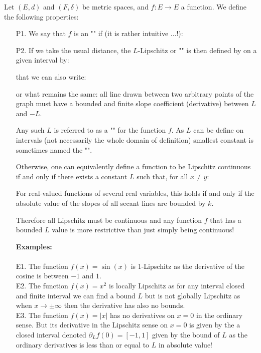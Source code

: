 	Let $(E, d)$ and $(F,\delta)$ be metric spaces, and $f:E \rightarrow E$ a function. We define the following properties:
	\begin{enumerate}
		\item[P1.] We say that $f$ is an "" if (it is rather intuitive ...!):
		
		
		\item[P2.] If we take the usual distance, the $L$-Lipschitz or "" is then defined by on a given interval by:
		
		that we can also write:
		
		or what remains the same: all line drawn between two arbitrary points of the graph must have a bounded and finite slope coefficient (derivative) between $L$ and $-L$.
		
		Any such $L$ is referred to as a "" for the function $f$. As $L$ can be define on intervals (not necessarily the whole domain of definition) smallest constant is sometimes named the "".
		
		Otherwise, one can equivalently define a function to be Lipschitz continuous if and only if there exists a constant $L$ such that, for all $x\neq y$:
		
		For real-valued functions of several real variables, this holds if and only if the absolute value of the slopes of all secant lines are bounded by $k$. 
		
		Therefore all Lipschitz must be continuous and any function $f$ that has a bounded $L$ value is more restrictive than just simply being continuous! 
		
		\begin{tcolorbox}[colframe=black,colback=white,sharp corners]
		\textbf{{\Large {}}Examples:}\\\\
		E1. The function $f(x)=\sin (x)$ is $1$-Lipschitz as the derivative of the cosine is between $-1$ and $1$.\\
		
		E2. The function $f(x)=x^2$ is locally Lipschitz as for any interval closed and finite interval we can find a bound $L$ but is not globally Lipschitz as when $x\rightarrow \pm\infty$ then the derivative has also no bounds.\\
		
		E3. The function $f(x)=|x|$ has no derivatives on $x=0$ in the ordinary sense. But its derivative in the Lipschitz sense on $x=0$ is given by the a closed interval denoted $\partial_L f(0)=[-1,1]$ given by the bound of $L$ as the ordinary derivatives is less than or equal to $L$ in absolute value!\\
		

\end{tcolorbox}
\end{enumerate}
